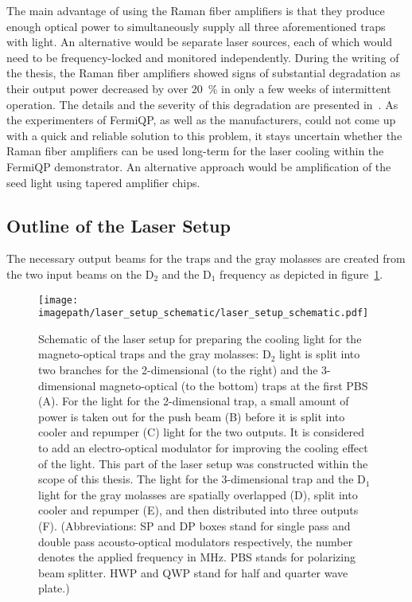 The main advantage of using the Raman fiber amplifiers is that they produce enough optical power to simultaneously supply all three aforementioned traps with light. An alternative would be separate laser sources, each of which would need to be frequency-locked and monitored independently. During the writing of the thesis, the Raman fiber amplifiers showed signs of substantial degradation as their output power decreased by over \SI{20}{\percent} in only a few weeks of intermittent operation. The details and the severity of this degradation are presented in~\cite{qesja_design_2022}. As the experimenters of FermiQP, as well as the manufacturers, could not come up with a quick and reliable solution to this problem, it stays uncertain whether the Raman fiber amplifiers can be used long-term for the laser cooling within the FermiQP demonstrator. An alternative approach would be amplification of the seed light using tapered amplifier chips.


\subsection*{Outline of the Laser Setup}
The necessary output beams for the traps and the gray molasses are created from the two input beams on the D$_2$ and the D$_1$ frequency as depicted in figure~\ref{fig:laser_setup_schematic}.

\begin{figure}
    \centering
    \texttt{[image: \\imagepath/laser\_setup\_schematic/laser\_setup\_schematic.pdf]}
    \caption{Schematic of the laser setup for preparing the cooling light for the magneto-optical traps and the gray molasses: D$_2$ light is split into two branches for the 2-dimensional (to the right) and the 3-dimensional magneto-optical (to the bottom) traps at the first PBS (A).
    For the light for the 2-dimensional trap, a small amount of power is taken out for the push beam (B) before it is split into cooler and repumper (C) light for the two outputs. It is considered to add an electro-optical modulator for improving the cooling effect of the light. This part of the laser setup was constructed within the scope of this thesis.
    The light for the 3-dimensional trap and the D$_1$ light for the gray molasses are spatially overlapped (D), split into cooler and repumper (E), and then distributed into three outputs (F).
    (Abbreviations: SP and DP boxes stand for single pass and double pass acousto-optical modulators respectively, the number denotes the applied frequency in \si{\mega\hertz}. PBS stands for polarizing beam splitter. HWP and QWP stand for half and quarter wave plate.)
    }
    \label{fig:laser_setup_schematic}
\end{figure}

